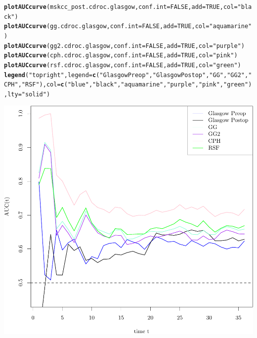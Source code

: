 \documentclass{article}\usepackage[]{graphicx}\usepackage[]{color}
\makeatletter
\def\maxwidth{ %
  \ifdim\Gin@nat@width>\linewidth
    \linewidth
  \else
    \Gin@nat@width
  \fi
}
\newcommand{\hlnum}[1]{\textcolor[rgb]{0.686,0.059,0.569}{#1}}%
\newcommand{\hlstr}[1]{\textcolor[rgb]{0.192,0.494,0.8}{#1}}%
\newcommand{\hlstd}[1]{\textcolor[rgb]{0.345,0.345,0.345}{#1}}%
\newcommand{\hlkwc}[1]{\textcolor[rgb]{0.333,0.667,0.333}{#1}}%
\newcommand{\hlkwd}[1]{\textcolor[rgb]{0.737,0.353,0.396}{\textbf{#1}}}%
\newenvironment{kframe}{%
 \def\at@end@of@kframe{}%
 \ifinner\ifhmode%
  \def\at@end@of@kframe{\end{minipage}}%
  \begin{minipage}{\columnwidth}%
 \fi\fi%
 \def\FrameCommand##1{\hskip\@totalleftmargin \hskip-\fboxsep
 \colorbox{shadecolor}{##1}\hskip-\fboxsep
     \hskip-\linewidth \hskip-\@totalleftmargin \hskip\columnwidth}%
 \MakeFramed {\advance\hsize-\width
   \@totalleftmargin\z@ \linewidth\hsize
   \@setminipage}}%
 {\par\unskip\endMakeFramed%
 \at@end@of@kframe}
\newenvironment{knitrout}{}{} %
\makeatother
\begin{document}
\begin{knitrout}
\begin{kframe}
\begin{alltt}
\hlkwd{plotAUCcurve}\hlstd{(mskcc_post.cdroc.glasgow,} \hlkwc{conf.int} \hlstd{=} \hlnum{FALSE}\hlstd{,} \hlkwc{add} \hlstd{=} \hlnum{TRUE}\hlstd{,} \hlkwc{col} \hlstd{=} \hlstr{"black"}\hlstd{)}
\hlkwd{plotAUCcurve}\hlstd{(gg.cdroc.glasgow,} \hlkwc{conf.int} \hlstd{=} \hlnum{FALSE}\hlstd{,} \hlkwc{add} \hlstd{=} \hlnum{TRUE}\hlstd{,} \hlkwc{col} \hlstd{=} \hlstr{"aquamarine"}\hlstd{)}
\hlkwd{plotAUCcurve}\hlstd{(gg2.cdroc.glasgow,} \hlkwc{conf.int} \hlstd{=} \hlnum{FALSE}\hlstd{,} \hlkwc{add} \hlstd{=} \hlnum{TRUE}\hlstd{,} \hlkwc{col} \hlstd{=} \hlstr{"purple"}\hlstd{)}
\hlkwd{plotAUCcurve}\hlstd{(cph.cdroc.glasgow,} \hlkwc{conf.int} \hlstd{=} \hlnum{FALSE}\hlstd{,} \hlkwc{add} \hlstd{=} \hlnum{TRUE}\hlstd{,} \hlkwc{col} \hlstd{=} \hlstr{"pink"}\hlstd{)}
\hlkwd{plotAUCcurve}\hlstd{(rsf.cdroc.glasgow,} \hlkwc{conf.int} \hlstd{=} \hlnum{FALSE}\hlstd{,} \hlkwc{add} \hlstd{=} \hlnum{TRUE}\hlstd{,} \hlkwc{col} \hlstd{=} \hlstr{"green"}\hlstd{)}
\hlkwd{legend}\hlstd{(}\hlstr{"topright"}\hlstd{,} \hlkwc{legend} \hlstd{=} \hlkwd{c}\hlstd{(}\hlstr{"Glasgow Preop"}\hlstd{,} \hlstr{"Glasgow Postop"}\hlstd{,} \hlstr{"GG"}\hlstd{,} \hlstr{"GG2"}\hlstd{,} \hlstr{"CPH"}\hlstd{,} \hlstr{"RSF"}\hlstd{),} \hlkwc{col} \hlstd{=} \hlkwd{c}\hlstd{(}\hlstr{"blue"}\hlstd{,} \hlstr{"black"}\hlstd{,} \hlstr{"aquamarine"}\hlstd{,} \hlstr{"purple"}\hlstd{,} \hlstr{"pink"}\hlstd{,} \hlstr{"green"}\hlstd{),} \hlkwc{lty} \hlstd{=} \hlstr{"solid"}\hlstd{)}
\end{alltt}
\end{kframe}

{\centering \includegraphics[width=\maxwidth]{figure/05-timeROC-1} 

}



\end{knitrout}
\end{document}
